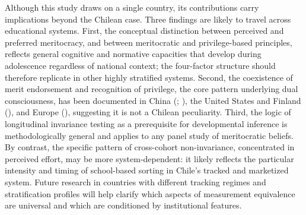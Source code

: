 \documentclass[
  13pt,
]{article}
\begin{document}
Although this study draws on a single country, its contributions carry
implications beyond the Chilean case. Three findings are likely to
travel across educational systems. First, the conceptual distinction
between perceived and preferred meritocracy, and between meritocratic
and privilege-based principles, reflects general cognitive and normative
capacities that develop during adolescence regardless of national
context; the four-factor structure should therefore replicate in other
highly stratified systems. Second, the coexistence of merit endorsement
and recognition of privilege, the core pattern underlying dual
consciousness, has been documented in China
(;
), the United
States and Finland (),
and Europe (), suggesting it is not a Chilean peculiarity. Third, the
logic of longitudinal invariance testing as a prerequisite for
developmental inference is methodologically general and applies to any
panel study of meritocratic beliefs. By contrast, the specific pattern
of cross-cohort non-invariance, concentrated in perceived effort, may be
more system-dependent: it likely reflects the particular intensity and
timing of school-based sorting in Chile's tracked and marketized system.
Future research in countries with different tracking regimes and
stratification profiles will help clarify which aspects of measurement
equivalence are universal and which are conditioned by institutional
features.
\end{document}
